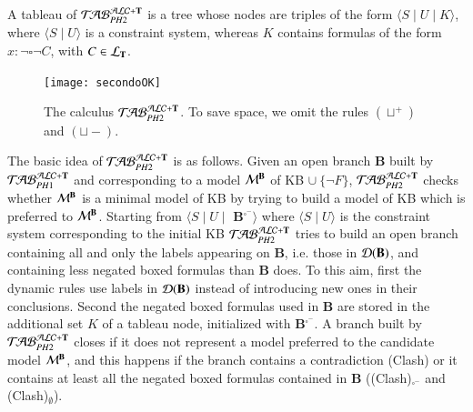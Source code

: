 \documentclass[a4paper, 11pt, oneside]{elsarticle}
\newcommand{\tip}{{\bf T}}
\newcommand{\hide}[1]{}
\newcommand{\unione} {\cup}
\newcommand{\vuoto} {\emptyset}
\newcommand{\nott} {\lnot}
\newcommand{\tc} {\mid}
\newcommand{\bbox}{\square}
\newcommand{\sx} {\langle}
\newcommand{\dx} {\rangle}
\newcommand{\perogni} {\forall}
\newcommand{\db}{\mathcal{D}(\mbox{\bf B})}
\newcommand{\ellet} {\mathcal{L}_{\bf T}}
\newcommand{\emme} {\begin{mathcal}M\end{mathcal}}
\newcommand{\primo}{\mathrel{{\mathcal{T}\!\mathcal{AB}}}_{PH 1}^{\mathcal{ALC}+\mbox{\scriptsize $\tip$}}}
\newcommand{\secondo}{\mathrel{{\mathcal{T}\!\mathcal{AB}}}_{PH 2}^{\mathcal{ALC}+\mbox{\scriptsize $\tip$}}}
\begin{document}
\hide{\noindent Intuitively, $\db$ is the set of individual
constants and variables occurring in {\bf B}, whereas {\bf
B}$^{\bbox^{-}}$ is the set of formulas $x: \nott \bbox \nott C$
occurring in {\bf B}.}

\noindent  A tableau of $\secondo$ is a tree whose
nodes are triples of the form $\sx S \tc U \tc K \dx$, where $\sx S \tc U \dx$ is a constraint system, whereas $K$ contains formulas
of the form $x: \nott \bbox \nott C$, with $C \in \ellet$.


\begin{figure}[t]
{\centerline{
\texttt{[image: secondoOK]}} }  \caption{The calculus $\secondo$. To save space, we omit the rules $(\sqcup^+)$ and $(\sqcup-)$.}\label{immagine secondo}
\end{figure}




The basic idea of $\secondo$ is as follows. Given an open branch
{\bf B} built by $\primo$ and corresponding to a model $\emme^{\bf
B}$ of KB $\unione \ \{\nott F\}$, $\secondo$ checks whether
$\emme^{\bf B}$ is a minimal model of KB by trying to build a
model of KB which is preferred to $\emme^{\bf B}$. \hide{Checking
(un)satisfiability of , allows to verify whether the candidate
model $\emme^{\bf B}$ is minimal.} Starting from $\sx S \tc U \tc$
{\bf B}$^{\bbox^-} \dx$ where $\sx S \tc U \dx$ is the
 constraint system corresponding to the initial KB $\secondo$ tries
to build an open branch containing  all and only the labels
appearing on {\bf B}, i.e. those in $\db$, and containing less
negated boxed formulas than {\bf B} does. To this aim, first the
dynamic rules use labels in $\db$ instead of introducing new ones
in their conclusions. Second the negated boxed formulas used in
{\bf B} are stored in  the additional set $K$ of a tableau node,
initialized with {\bf B}$^{\bbox^-}$. \hide{, is used in order to
ensure that any branch {\bf B'} built by $\secondo$ is preferred
to {\bf B}, that is {\bf B'} only contains  negated boxed formulas
occurring in {\bf B} and there exists at least a $x: \nott \bbox
\nott C$ that occurs in {\bf B} and \emph{does not occur} in {\bf
B'}.} A branch built by $\secondo$ closes if it does not represent
a model preferred to the candidate model $\emme^{\bf B}$, and this
happens if the branch contains a contradiction (Clash) or it
contains at least all the negated boxed formulas contained in {\bf
B} ((Clash)$_{\bbox^{-}}$ and (Clash)$_{\vuoto}$).


\hide{$\secondo$ also contains analogues of the following rules
from $\primo$ in Figure \ref{immagine calcolo}: $(\nott)$,
$(\tip^+)$, $(\tip^-)$, $(cut)$, $(\perogni^+)$, where the rules
in $\secondo$ include the additional\hide{third} component $K$.}
\end{document}
